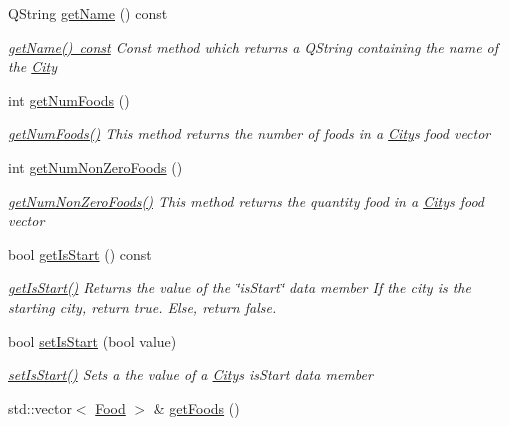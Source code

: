 \begin{DoxyCompactItemize}
Q\+String \mbox{\hyperlink{class_city_ad73598d937870a165cb530958106ff07}{get\+Name}} () const
\begin{DoxyCompactList}\small\item\em \mbox{\hyperlink{class_city_ad73598d937870a165cb530958106ff07}{get\+Name() const}} Const method which returns a Q\+String containing the name of the \mbox{\hyperlink{class_city}{City}} \end{DoxyCompactList}\item 
int \mbox{\hyperlink{class_city_a1462a90a0d40e0d946903b1db214da0e}{get\+Num\+Foods}} ()
\begin{DoxyCompactList}\small\item\em \mbox{\hyperlink{class_city_a1462a90a0d40e0d946903b1db214da0e}{get\+Num\+Foods()}} This method returns the number of foods in a \mbox{\hyperlink{class_city}{City}}\textquotesingle{}s food vector \end{DoxyCompactList}\item 
int \mbox{\hyperlink{class_city_adc2840394de55c7fa19a0411d7b7541d}{get\+Num\+Non\+Zero\+Foods}} ()
\begin{DoxyCompactList}\small\item\em \mbox{\hyperlink{class_city_adc2840394de55c7fa19a0411d7b7541d}{get\+Num\+Non\+Zero\+Foods()}} This method returns the quantity food in a \mbox{\hyperlink{class_city}{City}}\textquotesingle{}s food vector \end{DoxyCompactList}\item 
bool \mbox{\hyperlink{class_city_ae817fa08cc2191da09c91c3d6b4069d5}{get\+Is\+Start}} () const
\begin{DoxyCompactList}\small\item\em \mbox{\hyperlink{class_city_ae817fa08cc2191da09c91c3d6b4069d5}{get\+Is\+Start()}} Returns the value of the \char`\"{}is\+Start\char`\"{} data member If the city is the starting city, return true. Else, return false. \end{DoxyCompactList}\item 
bool \mbox{\hyperlink{class_city_a9fcdb0c59ac7760dd3996803ddb6bf86}{set\+Is\+Start}} (bool value)
\begin{DoxyCompactList}\small\item\em \mbox{\hyperlink{class_city_a9fcdb0c59ac7760dd3996803ddb6bf86}{set\+Is\+Start()}} Sets a the value of a \mbox{\hyperlink{class_city}{City}}\textquotesingle{}s is\+Start data member \end{DoxyCompactList}\item 
std\+::vector$<$ \mbox{\hyperlink{class_food}{Food}} $>$ \& \mbox{\hyperlink{class_city_a16bcefb0db18d8692df25626542524f9}{get\+Foods}} ()

\end{DoxyCompactItemize}

